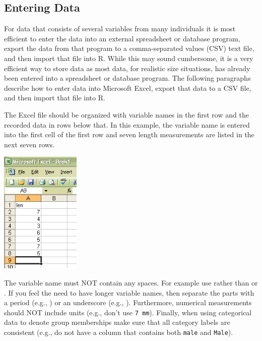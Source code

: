 \documentclass[10pt,openany]{book}\usepackage[]{graphicx}\usepackage[]{color}
\begin{document}
\subsection{Entering Data}  \label{sect:REnterData}
For data that consists of several variables from many individuals it is most efficient to enter the data into an external spreadsheet or database program, export the data from that program to a comma-separated values (CSV) text file, and then import that file into R.  While this may sound cumbersome, it is a very efficient way to store data as most data, for realistic size situations, has already been entered into a spreadsheet or database program.  The following paragraphs describe how to enter data into Microsoft Excel, export that data to a CSV file, and then import that file into R.


The Excel file should be organized with variable names in the first row and the recorded data in rows below that.  In this example, the variable name  is entered into the first cell of the first row and seven length measurements are listed in the next seven rows.
\begin{center}
  \includegraphics[width=1.5in]{Figs/Data_File_1.jpg}
\end{center}

The variable name must NOT contain any spaces.  For example use  rather than  or .  If you feel the need to have longer variable names, then separate the parts with a period (e.g., ) or an underscore (e.g., ).  Furthermore, numerical measurements should NOT include units (e.g., don't use \verb"7 mm").  Finally, when using categorical data to denote group memberships make sure that all category labels are consistent (e.g., do not have a column that contains both \verb"male" and \verb"Male").
\end{document}
